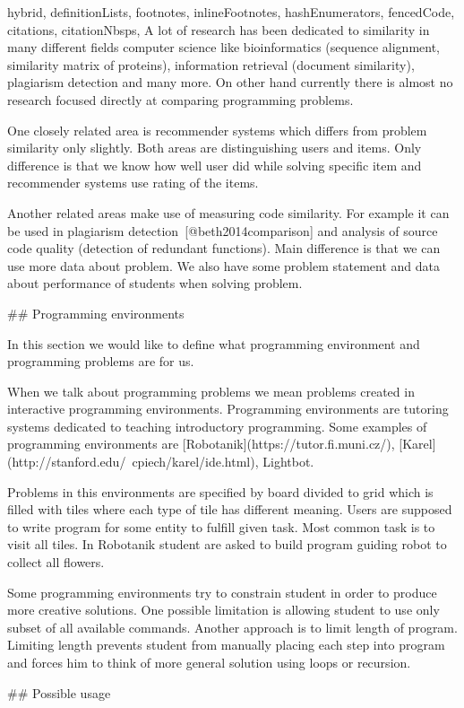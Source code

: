 \documentclass[
  digital, %
  table,   %
  nolof,     %
  nolot,     %
  nocover
]{fithesis3}
\begin{document}
\begin{markdown*}{%
  hybrid,
  definitionLists,
  footnotes,
  inlineFootnotes,
  hashEnumerators,
  fencedCode,
  citations,
  citationNbsps,
}
A lot of research has been dedicated to similarity in many different fields computer science like bioinformatics (sequence alignment, similarity matrix of proteins), information retrieval (document similarity), plagiarism detection and many more. On other hand currently there is almost no research focused directly at comparing programming problems.

One closely related area is recommender systems which differs from problem similarity only slightly. Both areas are distinguishing users and items. Only difference is that we know how well user did while solving specific item and recommender systems use rating of the items.

Another related areas make use of measuring code similarity. For example it can be used in plagiarism detection~[@beth2014comparison] and analysis of source code quality (detection of redundant functions). Main difference is that we can use more data about problem. We also have some problem statement and data about performance of students when solving problem.

## Programming environments

In this section we would like to define what programming environment and programming problems are for us.

When we talk about programming problems we mean problems created in interactive programming environments. Programming environments are tutoring systems dedicated to teaching introductory programming. Some examples of programming environments are [Robotanik](https://tutor.fi.muni.cz/), [Karel](http://stanford.edu/~cpiech/karel/ide.html), Lightbot.

Problems in this environments are specified by board divided to grid which is filled with tiles where each type of tile has different meaning. Users are supposed to write program for some entity to fulfill given task. Most common task is to visit all  tiles. In Robotanik student are asked to build program guiding robot to collect all flowers.

Some programming environments try to constrain student in order to produce more creative solutions. One possible limitation is allowing student to use only subset of all available commands. Another approach is to limit length of program. Limiting length prevents student from manually placing each step into program and forces him to think of more general solution using loops or recursion.

## Possible usage


\end{markdown*}
\end{document}
